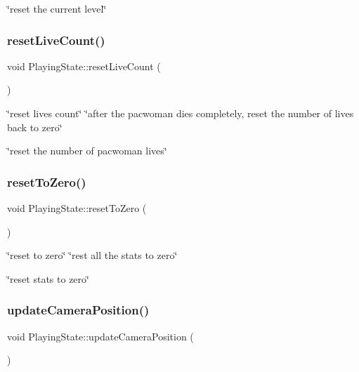 \char`\"{}reset the current level\char`\"{} \mbox{\label{classPlayingState_a528cb58eb4e5b1db4f20e4f6beeed513}} 
\subsubsection{\texorpdfstring{reset\+Live\+Count()}{resetLiveCount()}}
{\footnotesize\ttfamily void Playing\+State\+::reset\+Live\+Count (\begin{DoxyParamCaption}{ }\end{DoxyParamCaption})}



\char`\"{}reset lives count\char`\"{}  \char`\"{}after the pacwoman dies completely, reset the number of lives back to zero\char`\"{} 

\char`\"{}reset the number of pacwoman lives\char`\"{} \mbox{\label{classPlayingState_a1c8c1efbf757a3b62feda27bd7f25211}} 
\subsubsection{\texorpdfstring{reset\+To\+Zero()}{resetToZero()}}
{\footnotesize\ttfamily void Playing\+State\+::reset\+To\+Zero (\begin{DoxyParamCaption}{ }\end{DoxyParamCaption})}



\char`\"{}reset to zero\char`\"{}  \char`\"{}rest all the stats to zero\char`\"{} 

\char`\"{}reset stats to zero\char`\"{} \mbox{\label{classPlayingState_a9f65954a241c0cc7eed49cc13acbe65c}} 
\subsubsection{\texorpdfstring{update\+Camera\+Position()}{updateCameraPosition()}}
{\footnotesize\ttfamily void Playing\+State\+::update\+Camera\+Position (\begin{DoxyParamCaption}{ }\end{DoxyParamCaption})}



